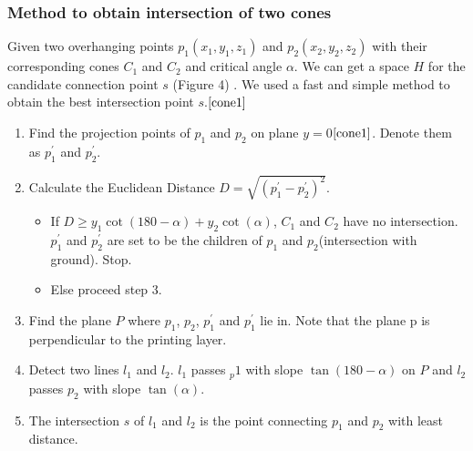 \documentclass[11pt, a4paper]{article}
\begin{document}
	\subsubsection{Method to obtain intersection of two cones}
	Given two overhanging points $p_1(x_1, y_1, z_1)$ and $p_2(x_2, y_2, z_2)$ with their corresponding cones $C_1$ and $C_2$ and critical angle $\alpha$. We can get a space $H$ for the candidate connection point $s$ (Figure 4) . We used a fast and simple method to obtain the best intersection point $s$.$\cite{cone1}$

	\begin{enumerate}
	\item Find the projection points of $p_1$ and $p_2$ on plane $y=0$$\cite{cone1}$. Denote them as $p_1^{'}$ and $p_2^{'}$.
	\item Calculate the Euclidean Distance $D=\sqrt{(p_1^{'}-p_2^{'})^{2}}$. 
	\begin{itemize}
	\item If $D\geq y_1\cot{(180-\alpha)}+y_2\cot{(\alpha)}$, $C_1$ and $C_2$ have no intersection. $p_1^{'}$ and $p_2^{'}$ are set to be the children of $p_1$ and $p_2$(intersection with ground). Stop.
	\item Else proceed step 3.
	\end{itemize}
	
	\item Find the plane $P$ where $p_1$, $p_2$, $p_1^{'}$ and $p_1^{'}$ lie in. Note that the plane p is perpendicular to the printing layer.
	\item Detect two lines $l_1$ and $l_2$. $l_1$ passes $_p1$ with slope $\tan{(180-\alpha)}$ on $P$ and $l_2$ passes $p_2$ with slope $\tan{(\alpha)}$.
	\item The intersection $s$ of $l_1$ and $l_2$ is the point connecting $p_1$ and $p_2$ with least distance.
	\end{enumerate}
\end{document}
